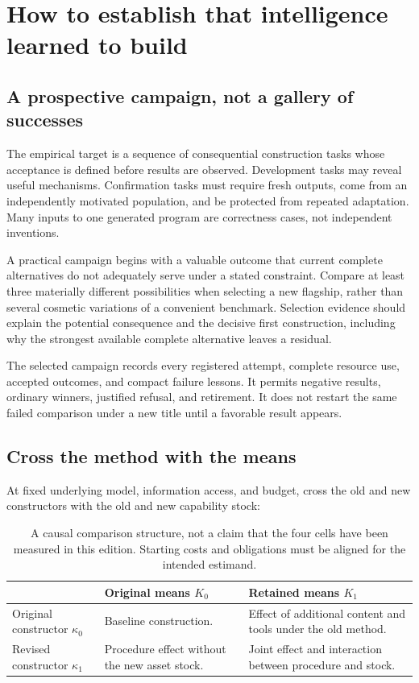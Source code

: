 \section{How to establish that intelligence learned to build}
\label{sec:evaluation}

\subsection{A prospective campaign, not a gallery of successes}

The empirical target is a sequence of consequential construction tasks whose acceptance is defined before results are observed. Development tasks may reveal useful mechanisms. Confirmation tasks must require fresh outputs, come from an independently motivated population, and be protected from repeated adaptation. Many inputs to one generated program are correctness cases, not independent inventions.

A practical campaign begins with a valuable outcome that current complete alternatives do not adequately serve under a stated constraint. Compare at least three materially different possibilities when selecting a new flagship, rather than several cosmetic variations of a convenient benchmark. Selection evidence should explain the potential consequence and the decisive first construction, including why the strongest available complete alternative leaves a residual.

The selected campaign records every registered attempt, complete resource use, accepted outcomes, and compact failure lessons. It permits negative results, ordinary winners, justified refusal, and retirement. It does not restart the same failed comparison under a new title until a favorable result appears.

\subsection{Cross the method with the means}

At fixed underlying model, information access, and budget, cross the old and new constructors with the old and new capability stock:
\begin{table}[htbp]
\centering\small
\begin{tabularx}{\linewidth}{@{}P{1.35in}YY@{}}
\toprule
 & \textbf{Original means $K_0$} & \textbf{Retained means $K_1$}\\
\midrule
Original constructor $\kappa_0$ & Baseline construction. & Effect of additional content and tools under the old method.\\
Revised constructor $\kappa_1$ & Procedure effect without the new asset stock. & Joint effect and interaction between procedure and stock.\\
\bottomrule
\end{tabularx}
\caption{A causal comparison structure, not a claim that the four cells have been measured in this edition. Starting costs and obligations must be aligned for the intended estimand.}
\label{tab:factorial}
\end{table}

